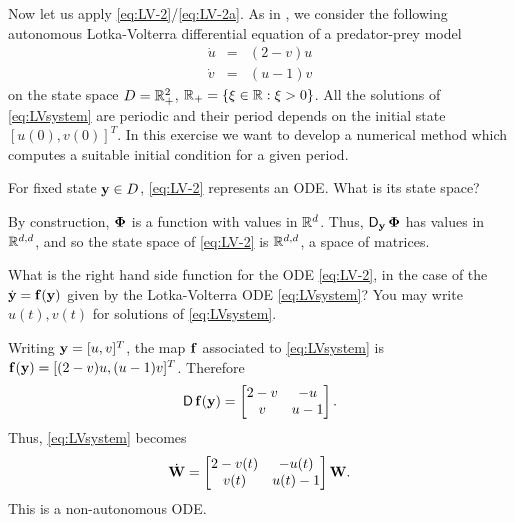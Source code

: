 \begin{problem}
Now let us apply \eqref{eq:LV-2}/\eqref{eq:LV-2a}.
As in , we consider the following autonomous Lotka-Volterra differential equation of a predator-prey model
\begin{equation}\label{eq:LVsystem}
  \begin{array}{ccl}
    \dot{u} &=& (2-v)u\\
    \dot{v} &=& (u-1)v
  \end{array}
\end{equation}
on the state space $D=\mathbb{R}_+^2$, $\mathbb{R}_+=\{\xi\in\mathbb{R}:\xi>0\}$. All the solutions of \eqref{eq:LVsystem} are periodic and their period depends on the initial state $[u(0),v(0)]^T$. In this exercise we want to develop a numerical method which computes a suitable initial condition for a given period.

\begin{subproblem}[1]
For fixed state ${\mathbf{y}}\in D$, \eqref{eq:LV-2} represents an ODE. What is its state space?
\begin{solution}
By construction, $\mathbf{\Phi}$ is a function with values in $\mathbb{R}^d$. Thus,
$\operatorname{\sf D}_{\mathbf{y}}\mathbf{\Phi}$ has values in $\mathbb{R}^{d,d}$, and so the state space of
\eqref{eq:LV-2} is $\mathbb{R}^{d,d}$, a space of matrices. 
\end{solution}
\end{subproblem}

\begin{subproblem}[1]
What is the right hand side function for the ODE \eqref{eq:LV-2}, in the case of the $\dot{{\mathbf{y}}}={\mathbf{f}}({\mathbf{y}})$ given by the Lotka-Volterra ODE \eqref{eq:LVsystem}? You may write $u(t),v(t)$ for solutions of \eqref{eq:LVsystem}.
\begin{solution}
Writing ${\mathbf{y}}=[u,v]^T$, the map ${\mathbf{f}}$ associated to \eqref{eq:LVsystem} is ${\mathbf{f}}({\mathbf{y}})=[(2-v)u,(u-1)v]^T$. Therefore
\[
\operatorname{\sf D}{\mathbf{f}}({\mathbf{y}})=\begin{bmatrix} 2-v & -u \\ v & u-1 \end{bmatrix}.
\]
Thus,  \eqref{eq:LVsystem} becomes
\begin{equation}\label{eq:W}
\dot {{\mathbf{W}}} = \begin{bmatrix} 2-v(t) & -u(t) \\ v(t) & u(t)-1 \end{bmatrix} {\mathbf{W}}.
\end{equation}
This is a non-autonomous ODE. 
\end{solution}
\end{subproblem}



\end{problem}
